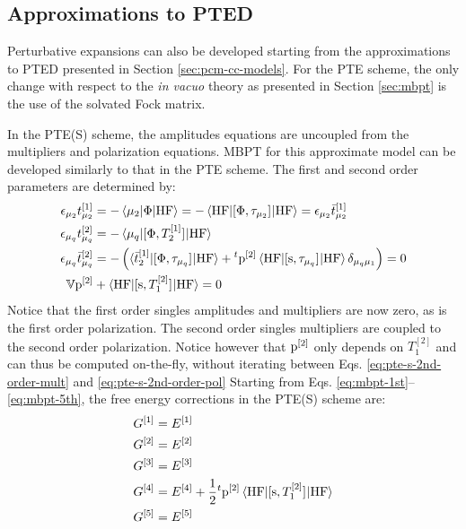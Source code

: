 \subsection{Approximations to PTED}

Perturbative expansions can also be developed starting from the
approximations to \acrshort{PTED} presented in Section
\ref{sec:pcm-cc-models}.
For the \acrshort{PTE} scheme, the only change with respect to the
\emph{in vacuo} theory as presented in Section \ref{sec:mbpt} is the use
of the solvated Fock matrix.\autocite{Olivares_del_Valle1991-of,
Angyan1995-co, Lipparini2009-io}

In the \acrshort{PTE(S)} scheme, the amplitudes equations are uncoupled
from the multipliers and polarization equations. \acrshort{MBPT} for
this approximate model can be developed similarly to that in the
\acrshort{PTE} scheme.
The first and second order parameters are determined by:
\begin{subequations}\label{eq:pte-s-mbpt}
  \begin{align}
  \epsilon_{\mu_2}t_{\mu_2}^{[1]} &=
  - \braket{\mu_2 | \Phi | \mathrm{HF}}
  =
  - \braket{\mathrm{HF} | [ \Phi, \tau_{\mu_2} ]^{} | \mathrm{HF}}
  =
  \epsilon_{\mu_2}\bar{t}_{\mu_2}^{[1]}
  \\
    \epsilon_{\mu_q}t_{\mu_q}^{[2]}
    &= -
      \braket{\mu_q | [ \Phi, T_2^{[1]} ]^{} | \mathrm{HF}}
  \\
    \epsilon_{\mu_q}\bar{t}_{\mu_q}^{[2]}
    &=
    - \left(
      \braket{\bar{t}_{2}^{[1]} | [ \Phi, \tau_{\mu_q} ]^{} | \mathrm{HF}}
      + {}^t\mathrm{p}^{[2]}\braket{\mathrm{HF} |
      [ \mathrm{s}, \tau_{\mu_q} ]^{} | \mathrm{HF}}\delta_{\mu_q\mu_1}
    \right)
    = 0
    \label{eq:pte-s-2nd-order-mult}
  \\
  \mathbb{V}\mathrm{p}^{[2]} &+ \braket{\mathrm{HF} | [ \mathrm{s}, T_1^{[2]} ]^{}| \mathrm{HF}} = 0
  \label{eq:pte-s-2nd-order-pol}
  \end{align}
\end{subequations}
Notice that the first order singles amplitudes and multipliers are now
zero, as is the first order polarization. The second order singles
multipliers are coupled to the second order polarization. Notice however
that $\mathrm{p}^{[2]}$ only depends on $T_1^{[2]}$ and can thus be computed
on-the-fly, without iterating between Eqs.
\eqref{eq:pte-s-2nd-order-mult} and \eqref{eq:pte-s-2nd-order-pol}
Starting from Eqs. \eqref{eq:mbpt-1st}--\eqref{eq:mbpt-5th}, the free energy
corrections in the \acrshort{PTE(S)} scheme are:
\begin{subequations}
  \begin{align}
    G^{[1]} &= E^{[1]} \label{eq:pte-s-mbpt-1st} \\
    G^{[2]} &= E^{[2]} \label{eq:pte-s-mbpt-2nd} \\
    G^{[3]} &= E^{[3]} \label{eq:pte-s-mbpt-3rd} \\
    G^{[4]} &= E^{[4]} + \frac{1}{2}
    {}^t\mathrm{p}^{[2]}\braket{\mathrm{HF} | [ \mathrm{s}, T_1^{[2]} ]^{}
    |\mathrm{HF}} \label{eq:pte-s-mbpt-4th} \\
    G^{[5]} &= E^{[5]} \label{eq:pte-s-mbpt-5th}
  \end{align}
\end{subequations}


